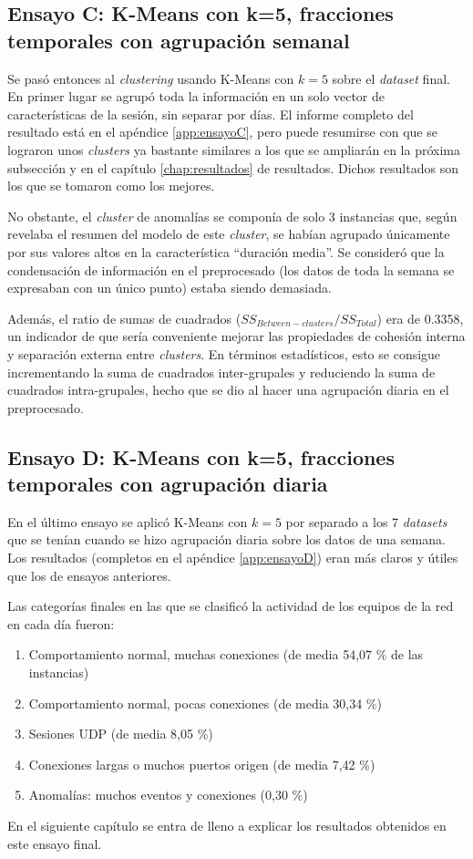 \subsection{Ensayo C: K-Means con k=5, fracciones temporales con agrupación semanal}\label{subsec:ensayoC}

Se pasó entonces al \emph{clustering} usando K-Means con $k=5$ sobre el \emph{dataset} final.
En primer lugar se agrupó toda la información en un solo vector de características de la sesión, sin separar por días.
El informe completo del resultado está en el apéndice \ref{app:ensayoC},
pero puede resumirse con que se lograron unos \emph{clusters} ya bastante similares a los que se ampliarán en la próxima subsección y en el capítulo \ref{chap:resultados} de resultados.
Dichos resultados son los que se tomaron como los mejores.

No obstante, el \emph{cluster} de anomalías se componía de solo 3 instancias que,
según revelaba el resumen del modelo de este \emph{cluster}, se habían agrupado únicamente por sus valores altos en la característica ``duración media''.
Se consideró que la condensación de información en el preprocesado (los datos de toda la semana se expresaban con un único punto) estaba siendo demasiada.

Además, el ratio de sumas de cuadrados ($SS_{Between-clusters} / SS_{Total}$) era de 0.3358,
un indicador de que sería conveniente mejorar las propiedades de cohesión interna y separación externa entre \emph{clusters}.
En términos estadísticos, esto se consigue incrementando la suma de cuadrados inter-grupales y reduciendo la suma de cuadrados intra-grupales,
hecho que se dio al hacer una agrupación diaria en el preprocesado.

\subsection{Ensayo D: K-Means con k=5, fracciones temporales con agrupación diaria}\label{subsec:ensayoD}

En el último ensayo se aplicó K-Means con $k=5$ por separado a los 7 \emph{datasets} que se tenían cuando se hizo agrupación diaria sobre los datos de una semana.
Los resultados (completos en el apéndice \ref{app:ensayoD}) eran más claros y útiles que los de ensayos anteriores.

Las categorías finales en las que se clasificó la actividad de los equipos de la red en cada día fueron:
\begin{enumerate}
    \item Comportamiento normal, muchas conexiones (de media 54,07 \% de las instancias)
    \item Comportamiento normal, pocas conexiones (de media 30,34 \%)
    \item Sesiones UDP (de media 8,05 \%)
    \item Conexiones largas o muchos puertos origen (de media 7,42 \%)
    \item Anomalías: muchos eventos y conexiones (0,30 \%)
\end{enumerate}

En el siguiente capítulo se entra de lleno a explicar los resultados obtenidos en este ensayo final.
